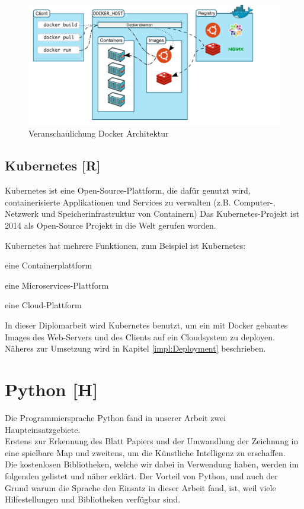 \begin{figure}[H]
    \centering
    \includegraphics[scale=0.6]{pics/docker architecture.PNG}
    \caption{Veranschaulichung Docker Architektur \cite{docker_architektur}}
\end{figure}


\subsection{Kubernetes [R]}
Kubernetes ist eine Open-Source-Plattform, die dafür genutzt wird, containerisierte Applikationen und Services zu verwalten (z.B. Computer-, Netzwerk und Speicherinfrastruktur von Containern)
Das Kubernetes-Projekt ist 2014 als Open-Source Projekt in die Welt gerufen worden.

Kubernetes hat mehrere Funktionen, zum Beispiel ist Kubernetes:
\begin{compactitem}
    \item eine Containerplattform
    \item eine Microservices-Plattform
    \item eine Cloud-Plattform
\end{compactitem}
\cite{kubernetes}

In dieser Diplomarbeit wird Kubernetes benutzt, um ein mit Docker gebautes Images des Web-Servers und des Clients auf ein Cloudsystem zu deployen. Näheres zur Umsetzung wird in Kapitel \ref{impl:Deployment} beschrieben.


\newpage
\section{Python [H]}
Die Programmiersprache Python
fand in unserer Arbeit zwei Haupteinsatzgebiete. \\
Erstens zur Erkennung des Blatt Papiers und der Umwandlung der Zeichnung in eine spielbare Map
und zweitens, um die Künstliche Intelligenz zu erschaffen. \\
Die kostenlosen Bibliotheken, welche wir dabei in Verwendung haben, werden im folgenden gelistet und näher
erklärt.
Der Vorteil von Python, und auch der Grund warum die Sprache den Einsatz in dieser Arbeit fand, ist, weil
viele Hilfestellungen und Bibliotheken verfügbar sind.

